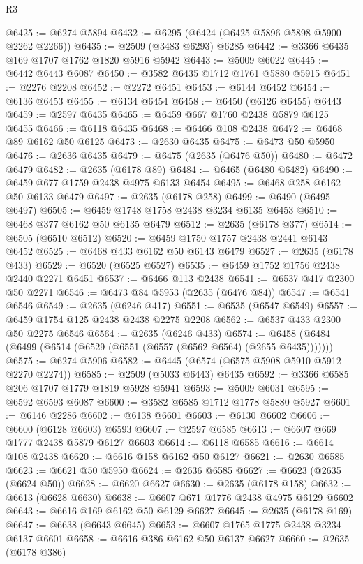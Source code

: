 \begin{lexlean}{R3}
\begin{coremodule}
@6425 := @6274 @5894
@6432 := @6295 (@6424 (@6425 @5896 @5898 @5900 @2262 @2266))
@6435 := @2509 (@3483 @6293) @6285
@6442 := @3366 @6435 @169 @1707 @1762 @1820 @5916 @5942
@6443 := @5009 @6022
@6445 := @6442 @6443 @6087
@6450 := @3582 @6435 @1712 @1761 @5880 @5915
@6451 := @2276 @2208
@6452 := @2272 @6451
@6453 := @6144 @6452
@6454 := @6136 @6453
@6455 := @6134 @6454
@6458 := @6450 (@6126 @6455) @6443
@6459 := @2597 @6435
@6465 := @6459 @667 @1760 @2438 @5879 @6125 @6455
@6466 := @6118 @6435
@6468 := @6466 @108 @2438
@6472 := @6468 @89 @6162 @50 @6125
@6473 := @2630 @6435
@6475 := @6473 @50 @5950
@6476 := @2636 @6435
@6479 := @6475 (@2635 (@6476 @50))
@6480 := @6472 @6479
@6482 := @2635 (@6178 @89)
@6484 := @6465 (@6480 @6482)
@6490 := @6459 @677 @1759 @2438 @4975 @6133 @6454
@6495 := @6468 @258 @6162 @50 @6133 @6479
@6497 := @2635 (@6178 @258)
@6499 := @6490 (@6495 @6497)
@6505 := @6459 @1748 @1758 @2438 @3234 @6135 @6453
@6510 := @6468 @377 @6162 @50 @6135 @6479
@6512 := @2635 (@6178 @377)
@6514 := @6505 (@6510 @6512)
@6520 := @6459 @1750 @1757 @2438 @2441 @6143 @6452
@6525 := @6468 @433 @6162 @50 @6143 @6479
@6527 := @2635 (@6178 @433)
@6529 := @6520 (@6525 @6527)
@6535 := @6459 @1752 @1756 @2438 @2440 @2271 @6451
@6537 := @6466 @113 @2438
@6541 := @6537 @417 @2300 @50 @2271
@6546 := @6473 @84 @5953 (@2635 (@6476 @84))
@6547 := @6541 @6546
@6549 := @2635 (@6246 @417)
@6551 := @6535 (@6547 @6549)
@6557 := @6459 @1754 @125 @2438 @2438 @2275 @2208
@6562 := @6537 @433 @2300 @50 @2275 @6546
@6564 := @2635 (@6246 @433)
@6574 := @6458 (@6484 (@6499 (@6514 (@6529 (@6551 (@6557 (@6562 @6564) (@2655 @6435)))))))
@6575 := @6274 @5906
@6582 := @6445 (@6574 (@6575 @5908 @5910 @5912 @2270 @2274))
@6585 := @2509 (@5033 @6443) @6435
@6592 := @3366 @6585 @206 @1707 @1779 @1819 @5928 @5941
@6593 := @5009 @6031
@6595 := @6592 @6593 @6087
@6600 := @3582 @6585 @1712 @1778 @5880 @5927
@6601 := @6146 @2286
@6602 := @6138 @6601
@6603 := @6130 @6602
@6606 := @6600 (@6128 @6603) @6593
@6607 := @2597 @6585
@6613 := @6607 @669 @1777 @2438 @5879 @6127 @6603
@6614 := @6118 @6585
@6616 := @6614 @108 @2438
@6620 := @6616 @158 @6162 @50 @6127
@6621 := @2630 @6585
@6623 := @6621 @50 @5950
@6624 := @2636 @6585
@6627 := @6623 (@2635 (@6624 @50))
@6628 := @6620 @6627
@6630 := @2635 (@6178 @158)
@6632 := @6613 (@6628 @6630)
@6638 := @6607 @671 @1776 @2438 @4975 @6129 @6602
@6643 := @6616 @169 @6162 @50 @6129 @6627
@6645 := @2635 (@6178 @169)
@6647 := @6638 (@6643 @6645)
@6653 := @6607 @1765 @1775 @2438 @3234 @6137 @6601
@6658 := @6616 @386 @6162 @50 @6137 @6627
@6660 := @2635 (@6178 @386)

\end{coremodule}
\end{lexlean}
